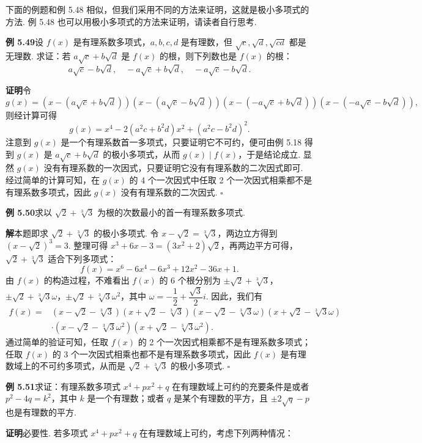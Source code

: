 \documentclass[UTF8, 12pt, fontset=fandol, oneside]{ctexart}
\begin{document}
下面的例题和例 5.48 相似，但我们采用不同的方法来证明，这就是极小多项式的方法. 例 5.48 也可以用极小多项式的方法来证明，请读者自行思考.

\noindent\textbf{例 5.49}\quad 设 $f(x)$ 是有理系数多项式，$a,b,c,d$ 是有理数，但 $\sqrt c,\sqrt d,\sqrt{cd}$ 都是无理数. 求证：若 $a\sqrt c+b\sqrt d$ 是 $f(x)$ 的根，则下列数也是 $f(x)$ 的根：
\[
a\sqrt c-b\sqrt d,\quad -a\sqrt c+b\sqrt d,\quad -a\sqrt c-b\sqrt d.
\]

\noindent\textbf{证明}\quad 令
\[
g(x)=(x-(a\sqrt c+b\sqrt d))(x-(a\sqrt c-b\sqrt d))(x-(-a\sqrt c+b\sqrt d))(x-(-a\sqrt c-b\sqrt d)),
\]
则经计算可得
\[
g(x)=x^4-2(a^2c+b^2d)x^2+(a^2c-b^2d)^2.
\]
注意到 $g(x)$ 是一个有理系数首一多项式，只要证明它不可约，便可由例 5.18 得到 $g(x)$ 是 $a\sqrt c+b\sqrt d$ 的极小多项式，从而 $g(x)\mid f(x)$，于是结论成立. 显然 $g(x)$ 没有有理系数的一次因式，只要证明它没有有理系数的二次因式即可. 经过简单的计算可知，在 $g(x)$ 的 4 个一次因式中任取 2 个一次因式相乘都不是有理系数多项式，因此 $g(x)$ 没有有理系数的二次因式. \hfill $\square$

\noindent\textbf{例 5.50}\quad 求以 $\sqrt2+\sqrt[3]{3}$ 为根的次数最小的首一有理系数多项式.

\noindent\textbf{解}\quad 本题即求 $\sqrt2+\sqrt[3]{3}$ 的极小多项式. 令 $x-\sqrt2=\sqrt[3]{3}$，两边立方得到 $(x-\sqrt2)^3=3$. 整理可得 $x^3+6x-3=(3x^2+2)\sqrt2$，再两边平方可得，$\sqrt2+\sqrt[3]{3}$ 适合下列多项式：
\[
f(x)=x^6-6x^4-6x^3+12x^2-36x+1.
\]
由 $f(x)$ 的构造过程，不难看出 $f(x)$ 的 6 个根分别为 $\pm\sqrt2+\sqrt[3]{3}$，$\pm\sqrt2+\sqrt[3]{3}\omega$，$\pm\sqrt2+\sqrt[3]{3}\omega^2$，其中 $\omega=-\dfrac12+\dfrac{\sqrt3}{2}i$. 因此，我们有
\[
\begin{aligned}
f(x)={}&(x-\sqrt2-\sqrt[3]{3})(x+\sqrt2-\sqrt[3]{3})(x-\sqrt2-\sqrt[3]{3}\omega)(x+\sqrt2-\sqrt[3]{3}\omega)\\
&\cdot (x-\sqrt2-\sqrt[3]{3}\omega^2)(x+\sqrt2-\sqrt[3]{3}\omega^2).
\end{aligned}
\]
通过简单的验证可知，任取 $f(x)$ 的 2 个一次因式相乘都不是有理系数多项式；任取 $f(x)$ 的 3 个一次因式相乘也都不是有理系数多项式，因此 $f(x)$ 是有理数域上的不可约多项式，从而是 $\sqrt2+\sqrt[3]{3}$ 的极小多项式. \hfill $\square$

\noindent\textbf{例 5.51}\quad 求证：有理系数多项式 $x^4+px^2+q$ 在有理数域上可约的充要条件是或者 $p^2-4q=k^2$，其中 $k$ 是一个有理数；或者 $q$ 是某个有理数的平方，且 $\pm2\sqrt q-p$ 也是有理数的平方.

\noindent\textbf{证明}\quad 必要性. 若多项式 $x^4+px^2+q$ 在有理数域上可约，考虑下列两种情况：
\end{document}

